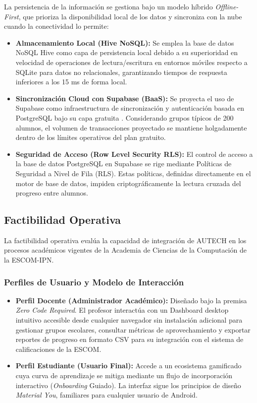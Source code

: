 La persistencia de la información se gestiona bajo un modelo híbrido \textit{Offline-First}, que prioriza la disponibilidad local de los datos y sincroniza con la nube cuando la conectividad lo permite:
\begin{itemize}
    \item \textbf{Almacenamiento Local (Hive NoSQL):} Se emplea la base de datos NoSQL Hive como capa de persistencia local debido a su superioridad en velocidad de operaciones de lectura/escritura en entornos móviles respecto a SQLite para datos no relacionales, garantizando tiempos de respuesta inferiores a los 15 ms de forma local.
    \item \textbf{Sincronización Cloud con Supabase (BaaS):} Se proyecta el uso de Supabase como infraestructura de sincronización y autenticación basada en PostgreSQL bajo su capa gratuita \cite{supabase2024}. Considerando grupos típicos de 200 alumnos, el volumen de transacciones proyectado se mantiene holgadamente dentro de los límites operativos del plan gratuito.
    \item \textbf{Seguridad de Acceso (Row Level Security RLS):} El control de acceso a la base de datos PostgreSQL en Supabase se rige mediante Políticas de Seguridad a Nivel de Fila (RLS). Estas políticas, definidas directamente en el motor de base de datos, impiden criptográficamente la lectura cruzada del progreso entre alumnos.
\end{itemize}

\subsection{Factibilidad Operativa}
\label{subsec:factibilidad_operativa}

La factibilidad operativa evalúa la capacidad de integración de AUTECH en los procesos académicos vigentes de la Academia de Ciencias de la Computación de la ESCOM-IPN.

\subsubsection{Perfiles de Usuario y Modelo de Interacción}
\begin{itemize}
    \item \textbf{Perfil Docente (Administrador Académico):} Diseñado bajo la premisa \textit{Zero Code Required}. El profesor interactúa con un Dashboard desktop intuitivo accesible desde cualquier navegador sin instalación adicional para gestionar grupos escolares, consultar métricas de aprovechamiento y exportar reportes de progreso en formato CSV para su integración con el sistema de calificaciones de la ESCOM.
    \item \textbf{Perfil Estudiante (Usuario Final):} Accede a un ecosistema gamificado cuya curva de aprendizaje se mitiga mediante un flujo de incorporación interactivo (\textit{Onboarding} Guiado). La interfaz sigue los principios de diseño \textit{Material You}, familiares para cualquier usuario de Android.
\end{itemize}

